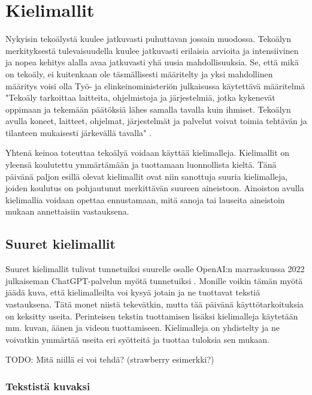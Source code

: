 \chapter{Kielimallit}%
\label{ch:kielimallit}

Nykyisin tekoälystä kuulee jatkuvasti puhuttavan jossain muodossa. Tekoälyn
merkityksestä tulevaisuudella kuulee jatkuvasti erilaisia arvioita ja
intensiivinen ja nopea kehitys alalla avaa jatkuvasti yhä uusia
mahdollisuuksia. Se, että mikä on tekoäly, ei kuitenkaan ole täsmällisesti
määritelty ja yksi mahdollinen määritys voisi olla Työ- ja elinkeinoministeriön
julkaisussa käytettävä määritelmä "Tekoäly tarkoittaa laitteita, ohjelmistoja
ja järjestelmiä, jotka kykenevät oppimaan ja tekemään päätöksiä lähes samalla
tavalla kuin ihmiset. Tekoälyn avulla koneet, laitteet, ohjelmat, järjestelmät
ja palvelut voivat toimia tehtävän ja tilanteen mukaisesti järkevällä tavalla"
\parencite{valtioneuvostoSuomenTekoalyaika}.

Yhtenä keinoa toteuttaa tekoälyä voidaan käyttää kielimalleja. Kielimallit on
yleensä koulutettu ymmärtämään ja tuottamaan luonnollista kieltä. Tänä päivänä
paljon esillä olevat kielimallit ovat niin sanottuja suuria kielimalleja,
joiden koulutus on pohjautunut merkittävän suureen aineistoon. Ainoiston avulla
kielimallia voidaan opettaa ennustamaan, mitä sanoja tai lauseita aineistoin
mukaan annettaisiin vastauksena.

\section{Suuret kielimallit}

Suuret kielimallit tulivat tunnetuiksi suurelle osalle OpenAI:n marraskuussa
2022 julkaiseman ChatGPT-palvelun myötä tunnetuiksi
\parencite{alma9911564814005973}. Monille voikin tämän myötä jäädä kuva, että
kielimalleilta voi kysyä jotain ja ne tuottavat tekstiä vastauksena. Tätä monet
niistä tekevätkin, mutta tää päivänä käyttötarkoituksia on keksitty useita.
Perinteisen tekstin tuottamisen lisäksi kielimalleja käytetään mm. kuvan,
äänen ja videon tuottamiseen. Kielimalleja on yhdistelty ja ne voivatkin
ymmärtää useita eri syötteitä ja tuottaa tuloksia sen mukaan.

TODO: Mitä niillä ei voi tehdä? (strawberry esimerkki?)

\subsection{Tekstistä kuvaksi}

